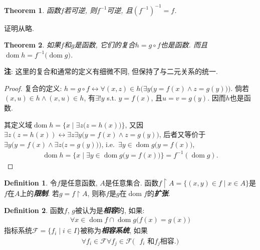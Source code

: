 \documentclass[UTF8,AutoFakeBold]{ctexart}
\theoremstyle{plain}
\newtheorem{theorem}{Theorem}[section] %
\theoremstyle{definition}
\newtheorem{definition}{Definition}[section] %
\newcommand*{\indexbf}[1]{\textit{\textbf{#1}}\index{#1}}
\DeclareMathOperator{\dom}{dom}
\begin{document}
\begin{theorem}
函数$f$若可逆, 则$f^{-1}$可逆, 且$(f^{-1})^{-1} = f$.
\end{theorem}
证明从略.


\begin{theorem}\label{composition_functions}
如果$f$和$g$是函数, 它们的复合$h=g\circ f$也是函数. 
而且$
\dom h=  f^{-1}\big(
	\dom g\big)$.
\end{theorem}
\textbf{注}: 这里的复合和通常的定义有细微不同, 但保持了与二元关系的统一. 
\begin{proof}
复合的定义: $
h=g\circ f \leftrightarrow 
	\forall (x,z)\in h\Big(
		\exists y\big(
			y=f(x)\wedge z=g(y)\big)\Big)$.
倘若$(x,u)\in h\wedge (x,u)\in h$, 有$\exists! y$ s.t. $y=f(x)$, 且$u=v=g(y)$. 因而$h$也是函数. 

其定义域$
\dom h = \{
	x\mid \exists z\big(
		z=h(x)\big)\}$, 
又因$
\exists z(z=h(x)) \leftrightarrow \exists z\exists y\big(
	y=f(x)\wedge z=g(y)\big)$, 后者又等价于$
\exists y\Big(
	y=f(x)\wedge \exists z\big(
		z=g(y)\big)\Big)$, i.e.\ $
\exists y\in \dom g \big(
	y=f(x)\big)$, 
\begin{align*}
	\dom h 
		= \{x\mid \exists y\in \dom g \big(
			y=f(x)\big)\}
		= f^{-1}(\dom g).
\end{align*}
\end{proof}


\begin{definition}
令$f$是任意函数, $A$是任意集合. 函数$f\upharpoonright A = \{ (x,y) \in f\mid x\in A\}$是$f$在$A$上的\indexbf{限制}. 若$g=f\upharpoonright A$, 则称$f$是$g$在$\dom f$的\indexbf{扩张}.
\end{definition}

\begin{definition}
函数$f$, $g$被认为是\indexbf{相容}的, 如果:
\begin{align*}
	\forall x\in \dom f\cap \dom g\big(
		f(x)=g(x)\big)
\end{align*}
指标系统$\mathcal F = \{f_i\mid i\in I\}$被称为\indexbf{相容系统}, 如果
\begin{align*}
\forall f_i\in \mathcal F\forall f_j\in \mathcal F\big(
	\text{ $f_i$ 和$f_j$相容.} \big)
\end{align*}
\end{definition}
\end{document}
